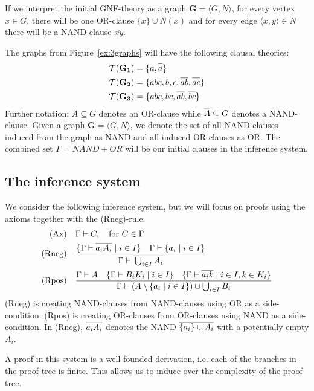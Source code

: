 If we interpret the initial GNF-theory as a graph $\mathbf{G}=\langle G,N\rangle$, for every vertex $x \in G$, there will be one OR-clause $\{ x \} \cup N(x)$ and for every edge $\langle x,y \rangle \in N$ there will be a NAND-clause $\overline{xy}$.

The graphs from Figure~\ref{ex:3graphs} will have the following clausal theories:
\begin{align}
  \mathcal{T}(\mathbf{G_1}) &= \{ a, \ol{a} \}\\
  \mathcal{T}(\mathbf{G_2}) &= \{ abc, b, c, \ol{ab}, \ol{ac} \}\\
  \mathcal{T}(\mathbf{G_3}) &= \{ abc, bc, \ol{ab}, \ol{bc} \}
\end{align}
Further notation: $A\subseteq G$ denotes an OR-clause while $\ol{A} \subseteq G$ denotes a NAND-clause.
Given a graph $\mathbf{G}=\langle G,N\rangle$, we denote the set of all NAND-clauses induced from the graph as NAND and all induced OR-clauses as OR.
The combined set $\Gamma = NAND + OR$ will be our initial clauses in the inference system.
\subsection{The inference system}
\label{sub:The inference system}
We consider the following inference system, but we will focus on proofs using the axioms together with the (Rneg)-rule.
\begin{align}
  \text{(Ax)} &\quad \Gamma \vdash C, \quad \text{for } C \in \Gamma\\
  \text{(Rneg)} &\quad \frac{ \{ \Gamma \vdash \ol{a_iA_i} \; |\; i \in I \} \quad \Gamma \vdash \{ a_i \; |\; i \in I \} }{ \Gamma \vdash \ol{\bigcup_{i \in I} A_i} }\\
  \text{(Rpos)} &\quad \frac{ \Gamma \vdash A \quad \{\Gamma \vdash B_iK_i \; |\; i \in I \} \quad \{ \Gamma \vdash \ol{a_ik} \; |\; i \in I, k \in K_i \} }{ \Gamma \vdash (A \setminus \{ a_i \; |\; i \in I \} ) \cup \bigcup_{i \in I} B_i }
\end{align}
(Rneg) is creating NAND-clauses from NAND-clauses using OR as a side-condition.
(Rpos) is creating OR-clauses from OR-clauses using NAND as a side-condition.
In (Rneg), $\ol{a_iA_i}$ denotes the NAND $\ol{\{ a_i \} \cup A_i}$ with a potentially empty $A_i$.

A proof in this system is a well-founded derivation, i.e. each of the branches in the proof tree is finite.
This allows us to induce over the complexity of the proof tree.

